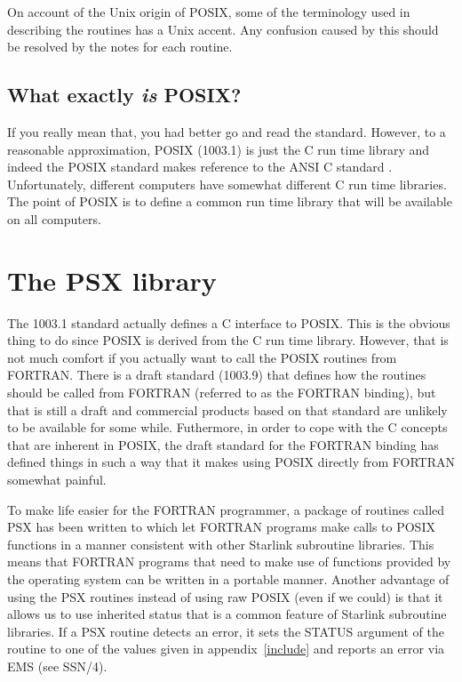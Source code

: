 On account of the Unix origin of POSIX, some of the terminology used in
describing the routines has a Unix accent. Any confusion caused by this should
be resolved by the notes for each routine.

\subsection{What exactly {\em is} POSIX?}

If you really mean that, you had better go and read the standard\cite{psx:std}.
However, to a reasonable approximation, POSIX (1003.1) is just the C run time
library and indeed the POSIX standard makes reference to the ANSI C standard
\cite{c:std}. Unfortunately, different computers have somewhat different C
run time libraries. The point of POSIX is to define a common run time library
that will be available on all computers. 

\section{The PSX library}

The 1003.1 standard actually defines a C interface to POSIX. This is the obvious
thing to do since POSIX is derived from the C run time library. However, that
is not much comfort if you actually want to call the POSIX routines from
FORTRAN. There is a draft standard (1003.9) that defines how the routines should
be called from FORTRAN (referred to as the FORTRAN binding), but that is still a
draft and commercial products based on that standard are unlikely to be
available for some while. Futhermore, in order to cope with the C concepts that
are inherent in POSIX, the draft standard for the FORTRAN binding has defined
things in such a way that it makes using POSIX directly from FORTRAN somewhat
painful. 

To make life easier for the FORTRAN programmer, a package of routines called
PSX has been written to which let FORTRAN programs make calls to POSIX
functions in a manner consistent with other Starlink subroutine libraries. This
means that FORTRAN programs that need to make use of functions provided by the
operating system can be written in a portable manner. Another advantage of
using the PSX routines instead of using raw POSIX (even if we could) is that it
allows us to use inherited status that is a common feature of Starlink
subroutine libraries. If a PSX routine detects an error, it sets the STATUS
argument of the routine to one of the values given in appendix~\ref{include} and
reports an error via EMS (see SSN/4).

